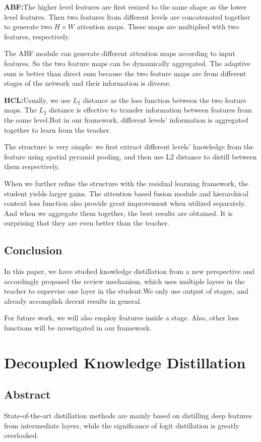 \documentclass[11pt]{article}
\begin{document}
\textbf{ABF:}The higher level features are first resized to the same shape as the lower level features. Then two features from different levels are concatenated together to generate two $H \times W$ attention maps. These maps are multiplied with two features, respectively.

The ABF module can generate different attention maps according to input features. So the two feature maps can be dynamically aggregated. The adaptive sum is better than direct sum because the two feature maps are from different stages of the network and their information is diverse.

\textbf{HCL:}Usually, we use $L_2$ distance as the loss function between the two feature maps. The $L_2$ distance is effective to transfer information between features from the same level.But in our framework, different levels’ information is aggregated together to learn from the teacher.

The structure is very simple: we first extract different levels’ knowledge from the feature using spatial pyramid pooling, and then use L2 distance to distill between them respectively.

When we further refine the structure with the residual learning framework, the student yields larger gains. The attention based fusion module and hierarchical context loss function also provide great improvement when utilized separately. And
when we aggregate them together, the best results are obtained. It is surprising that they are even better than the teacher.
\subsection{Conclusion}
In this paper, we have studied knowledge distillation from a new perspective and accordingly proposed the review mechanism, which uses multiple layers in the teacher to supervise one layer in the student.We only use output of stages, and
already accomplish decent results in general.

For future work, we will also employ features inside a stage. Also, other loss functions will be investigated in our framework.
\section{Decoupled Knowledge Distillation}
\subsection{Abstract}
State-of-the-art distillation methods are mainly based on distilling deep features from intermediate layers, while the significance of logit distillation is greatly overlooked.
\end{document}
